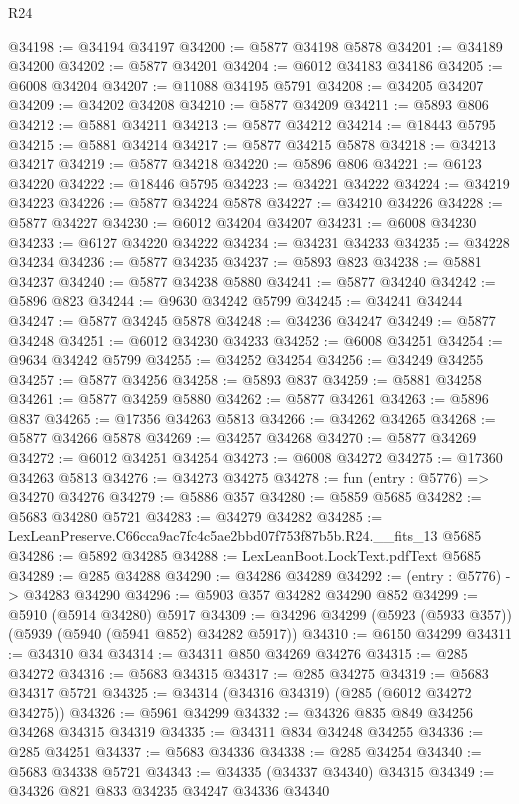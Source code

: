 \begin{lexlean}{R24}
\begin{coremodule}
@34198 := @34194 @34197
@34200 := @5877 @34198 @5878
@34201 := @34189 @34200
@34202 := @5877 @34201
@34204 := @6012 @34183 @34186
@34205 := @6008 @34204
@34207 := @11088 @34195 @5791
@34208 := @34205 @34207
@34209 := @34202 @34208
@34210 := @5877 @34209
@34211 := @5893 @806
@34212 := @5881 @34211
@34213 := @5877 @34212
@34214 := @18443 @5795
@34215 := @5881 @34214
@34217 := @5877 @34215 @5878
@34218 := @34213 @34217
@34219 := @5877 @34218
@34220 := @5896 @806
@34221 := @6123 @34220
@34222 := @18446 @5795
@34223 := @34221 @34222
@34224 := @34219 @34223
@34226 := @5877 @34224 @5878
@34227 := @34210 @34226
@34228 := @5877 @34227
@34230 := @6012 @34204 @34207
@34231 := @6008 @34230
@34233 := @6127 @34220 @34222
@34234 := @34231 @34233
@34235 := @34228 @34234
@34236 := @5877 @34235
@34237 := @5893 @823
@34238 := @5881 @34237
@34240 := @5877 @34238 @5880
@34241 := @5877 @34240
@34242 := @5896 @823
@34244 := @9630 @34242 @5799
@34245 := @34241 @34244
@34247 := @5877 @34245 @5878
@34248 := @34236 @34247
@34249 := @5877 @34248
@34251 := @6012 @34230 @34233
@34252 := @6008 @34251
@34254 := @9634 @34242 @5799
@34255 := @34252 @34254
@34256 := @34249 @34255
@34257 := @5877 @34256
@34258 := @5893 @837
@34259 := @5881 @34258
@34261 := @5877 @34259 @5880
@34262 := @5877 @34261
@34263 := @5896 @837
@34265 := @17356 @34263 @5813
@34266 := @34262 @34265
@34268 := @5877 @34266 @5878
@34269 := @34257 @34268
@34270 := @5877 @34269
@34272 := @6012 @34251 @34254
@34273 := @6008 @34272
@34275 := @17360 @34263 @5813
@34276 := @34273 @34275
@34278 := fun (entry : @5776) => @34270 @34276
@34279 := @5886 @357
@34280 := @5859 @5685
@34282 := @5683 @34280 @5721
@34283 := @34279 @34282
@34285 := LexLeanPreserve.C66cca9ac7fc4c5ae2bbd07f753f87b5b.R24.__fits_13 @5685
@34286 := @5892 @34285
@34288 := LexLeanBoot.LockText.pdfText @5685
@34289 := @285 @34288
@34290 := @34286 @34289
@34292 := (entry : @5776) -> @34283 @34290
@34296 := @5903 @357 @34282 @34290 @852
@34299 := @5910 (@5914 @34280) @5917
@34309 := @34296 @34299 (@5923 (@5933 @357)) (@5939 (@5940 (@5941 @852) @34282 @5917))
@34310 := @6150 @34299
@34311 := @34310 @34
@34314 := @34311 @850 @34269 @34276
@34315 := @285 @34272
@34316 := @5683 @34315
@34317 := @285 @34275
@34319 := @5683 @34317 @5721
@34325 := @34314 (@34316 @34319) (@285 (@6012 @34272 @34275))
@34326 := @5961 @34299
@34332 := @34326 @835 @849 @34256 @34268 @34315 @34319
@34335 := @34311 @834 @34248 @34255
@34336 := @285 @34251
@34337 := @5683 @34336
@34338 := @285 @34254
@34340 := @5683 @34338 @5721
@34343 := @34335 (@34337 @34340) @34315
@34349 := @34326 @821 @833 @34235 @34247 @34336 @34340

\end{coremodule}
\end{lexlean}

